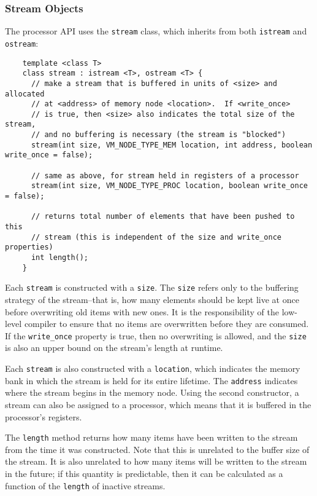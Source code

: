 \subsubsection{Stream Objects}
\label{sec:procstreams}

The processor API uses the {\tt stream} class, which inherits from
both {\tt istream} and {\tt ostream}:
{\small
\begin{verbatim}
    template <class T> 
    class stream : istream <T>, ostream <T> {
      // make a stream that is buffered in units of <size> and allocated
      // at <address> of memory node <location>.  If <write_once>
      // is true, then <size> also indicates the total size of the stream,
      // and no buffering is necessary (the stream is "blocked")
      stream(int size, VM_NODE_TYPE_MEM location, int address, boolean write_once = false);

      // same as above, for stream held in registers of a processor
      stream(int size, VM_NODE_TYPE_PROC location, boolean write_once = false);

      // returns total number of elements that have been pushed to this
      // stream (this is independent of the size and write_once properties)
      int length();
    }  
\end{verbatim}}

Each {\tt stream} is constructed with a {\tt size}.  The {\tt size}
refers only to the buffering strategy of the stream--that is, how many
elements should be kept live at once before overwriting old items with
new ones.  It is the responsibility of the low-level compiler to
ensure that no items are overwritten before they are consumed.  If the
{\tt write\_once} property is true, then no overwriting is allowed,
and the {\tt size} is also an upper bound on the stream's length at
runtime.

Each {\tt stream} is also constructed with a {\tt location}, which
indicates the memory bank in which the stream is held for its entire
lifetime.  The {\tt address} indicates where the stream begins in the
memory node.  Using the second constructor, a stream can also be
assigned to a processor, which means that it is buffered in the
processor's registers.

The {\tt length} method returns how many items have been written to
the stream from the time it was constructed.  Note that this is
unrelated to the buffer size of the stream.  It is also unrelated to
how many items will be written to the stream in the future; if this
quantity is predictable, then it can be calculated as a function of
the {\tt length} of inactive streams.

